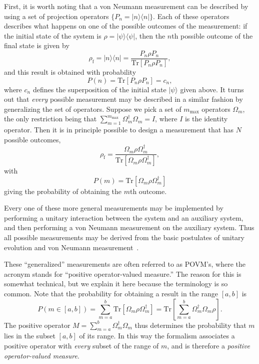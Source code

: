 \documentclass[aps,twocolumn,superscriptaddress,footinbib,floatfix,showpacs]{revtex4}
\def\ket#1{|{#1}\rangle}
\begin{document}
First, it is worth noting that a von Neumann measurement can be
described by using a set of projection operators $\{P_n = |n\rangle\langle n
|\}$. Each of these operators describes what happens on one of the
possible outcomes of the measurement: 
if the initial state of the system is $\rho
= |\psi\rangle\langle\psi| $, 
then the $n$th possible outcome of the final state is 
given by
\begin{equation}
   \rho_\mathrm{f} 
     = |n\rangle\langle n|
     = \frac{P_n \rho P_n}{\mathrm{Tr}[P_n \rho P_n]},
\end{equation}
and this result is obtained with probability
\begin{equation}
  P(n) = \mbox{Tr}[P_n\rho P_n] = c_n ,
\end{equation}
where $c_n$ defines the superposition of the initial state
$\ket\psi$ given above.
It turns out that \textit{every} possible measurement may be described in a
similar fashion by generalizing the set of operators. 
Suppose we pick a set of $m_\mathrm{max}$ 
operators $\Omega_m$, the
only restriction being that $\sum_{m=1}^{m_\mathrm{max}} \Omega_m^\dagger\Omega_m
= I$, where $I$ is the identity operator. 
Then it is in principle possible to design a measurement
that has $N$ possible outcomes, 
\begin{equation}
   \rho_\mathrm{f} = \frac{\Omega_m \rho \Omega_m^\dagger }
        {\mathrm{Tr}[\Omega_m \rho \Omega_m^\dagger ]},
\end{equation}
with
\begin{equation}
 P(m) = \mathrm{Tr}[\Omega_m \rho \Omega_m^\dagger ]
\end{equation}
giving the probability of obtaining the $m$th outcome.

Every one of these more general measurements may be implemented by
performing a unitary interaction between the system and an
auxiliary system, and then performing a von Neumann measurement on
the auxiliary system. Thus all possible measurements may be
derived from the basic postulates of unitary evolution and von 
Neumann measurement~\cite{Schumacher96,mikeandike}. 

These ``generalized'' measurements are often referred to as  
POVM's, where the acronym stands for ``positive operator-valued measure.'' 
The reason for this is somewhat technical, but we explain it here because 
the terminology is so common. Note that the probability for obtaining 
a result in the range $[a,b]$ is 
\begin{equation}
  P(m\in [a,b]) = \sum_{m=a}^{b}\mbox{Tr}\left[\Omega_m\rho  \Omega_m^\dagger\right] = \mbox{Tr}\left[\sum_{m=a}^{b} \Omega_m^\dagger\Omega_m\rho\right]  .
\end{equation}
The positive operator $M = \sum_{m=a}^{b}\Omega_m^\dagger\Omega_m$ thus 
determines the probability that $m$ lies in the subset $[a,b]$ of its range. In this way 
the formalism associates a positive operator with {\em every} subset of the 
range of $m$, and is therefore a {\em positive operator-valued measure}.
\end{document}
